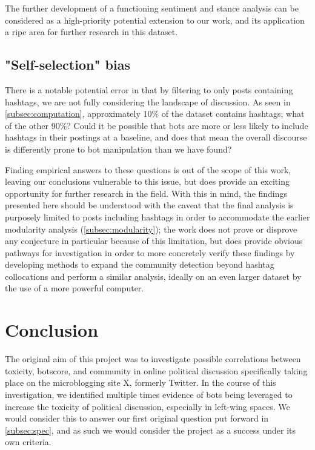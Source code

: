 \documentclass[a4paper,11pt]{article}  %
\begin{document}
	The further development of a functioning sentiment and stance analysis can be considered as a high-priority potential extension to our work, and its application a ripe area for further research in this dataset.

	\subsection{"Self-selection" bias}
	\label{subsec:bias}
	There is a notable potential error in that by filtering to only posts containing hashtags, we are not fully considering the landscape of discussion. As seen in \autoref{subsec:computation}, approximately 10\% of the dataset contains hashtags; what of the other 90\%? Could it be possible that bots are more or less likely to include hashtags in their postings at a baseline, and does that mean the overall discourse is differently prone to bot manipulation than we have found? 
	
	Finding empirical answers to these questions is out of the scope of this work, leaving our conclusions vulnerable to this issue, but does provide an exciting opportunity for further research in the field. With this in mind, the findings presented here should be understood with the caveat that the final analysis is purposely limited to posts including hashtags in order to accommodate the earlier modularity analysis (\autoref{subsec:modularity}); the work does not prove or disprove any conjecture in particular because of this limitation, but does provide obvious pathways for investigation in order to more concretely verify these findings by developing methods to expand the community detection beyond hashtag collocations and perform a similar analysis, ideally on an even larger dataset by the use of a more powerful computer.

	\section{Conclusion}
	\label{sec:conclusion}
	The original aim of this project was to investigate possible correlations between toxicity, botscore, and community in online political discussion specifically taking place on the microblogging site X, formerly Twitter. In the course of this investigation, we identified multiple times evidence of bots being leveraged to increase the toxicity of political discussion, especially in left-wing spaces. We would consider this to answer our first original question put forward in \autoref{subsec:spec}, and as such we would consider the project as a success under its own criteria.
\end{document}
